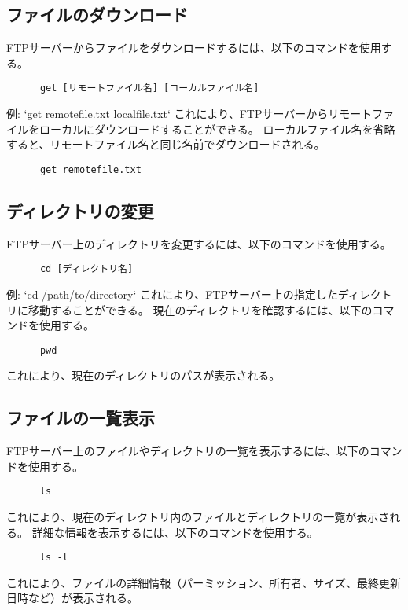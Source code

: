 \documentclass[a4paper,10pt]{jsarticle}
\begin{document}
    \subsection{ファイルのダウンロード}
    FTPサーバーからファイルをダウンロードするには、以下のコマンドを使用する。
    \begin{lstlisting}
      get [リモートファイル名] [ローカルファイル名]
    \end{lstlisting}
    例: `get remotefile.txt localfile.txt`
    これにより、FTPサーバーからリモートファイルをローカルにダウンロードすることができる。
    ローカルファイル名を省略すると、リモートファイル名と同じ名前でダウンロードされる。
    \begin{lstlisting}
      get remotefile.txt
    \end{lstlisting}

    \subsection{ディレクトリの変更}
    FTPサーバー上のディレクトリを変更するには、以下のコマンドを使用する。
    \begin{lstlisting}
      cd [ディレクトリ名]
    \end{lstlisting}
    例: `cd /path/to/directory`
    これにより、FTPサーバー上の指定したディレクトリに移動することができる。
    現在のディレクトリを確認するには、以下のコマンドを使用する。
    \begin{lstlisting}
      pwd
    \end{lstlisting}
    これにより、現在のディレクトリのパスが表示される。

    \subsection{ファイルの一覧表示}
    FTPサーバー上のファイルやディレクトリの一覧を表示するには、以下のコマンドを使用する。
    \begin{lstlisting}
      ls
    \end{lstlisting}
    これにより、現在のディレクトリ内のファイルとディレクトリの一覧が表示される。
    詳細な情報を表示するには、以下のコマンドを使用する。
    \begin{lstlisting}
      ls -l
    \end{lstlisting}
    これにより、ファイルの詳細情報（パーミッション、所有者、サイズ、最終更新日時など）が表示される。
\end{document}
